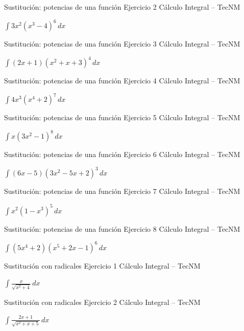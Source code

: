 \documentclass[aspectratio=169,12pt]{beamer}
\newcommand{\ejercicio}[1]{%
  \begin{center}
  \vfill
  {\fontsize{24}{30}\selectfont #1}
  \vfill
  \end{center}
}
\begin{document}
\begin{frame}{Sustitución: potencias de una función}
\small Ejercicio 2 \hfill Cálculo Integral -- TecNM
\ejercicio{$\displaystyle \int 3x^2(x^3-4)^6\,dx$}
\end{frame}

\begin{frame}{Sustitución: potencias de una función}
\small Ejercicio 3 \hfill Cálculo Integral -- TecNM
\ejercicio{$\displaystyle \int(2x+1)(x^2+x+3)^4\,dx$}
\end{frame}

\begin{frame}{Sustitución: potencias de una función}
\small Ejercicio 4 \hfill Cálculo Integral -- TecNM
\ejercicio{$\displaystyle \int 4x^3(x^4+2)^7\,dx$}
\end{frame}

\begin{frame}{Sustitución: potencias de una función}
\small Ejercicio 5 \hfill Cálculo Integral -- TecNM
\ejercicio{$\displaystyle \int x(3x^2-1)^8\,dx$}
\end{frame}

\begin{frame}{Sustitución: potencias de una función}
\small Ejercicio 6 \hfill Cálculo Integral -- TecNM
\ejercicio{$\displaystyle \int(6x-5)(3x^2-5x+2)^3\,dx$}
\end{frame}

\begin{frame}{Sustitución: potencias de una función}
\small Ejercicio 7 \hfill Cálculo Integral -- TecNM
\ejercicio{$\displaystyle \int x^2(1-x^3)^5\,dx$}
\end{frame}

\begin{frame}{Sustitución: potencias de una función}
\small Ejercicio 8 \hfill Cálculo Integral -- TecNM
\ejercicio{$\displaystyle \int(5x^4+2)(x^5+2x-1)^6\,dx$}
\end{frame}

\begin{frame}{Sustitución con radicales}
\small Ejercicio 1 \hfill Cálculo Integral -- TecNM
\ejercicio{$\displaystyle \int\frac{x}{\sqrt{x^2+4}}\,dx$}
\end{frame}

\begin{frame}{Sustitución con radicales}
\small Ejercicio 2 \hfill Cálculo Integral -- TecNM
\ejercicio{$\displaystyle \int\frac{2x+1}{\sqrt{x^2+x+5}}\,dx$}
\end{frame}
\end{document}

